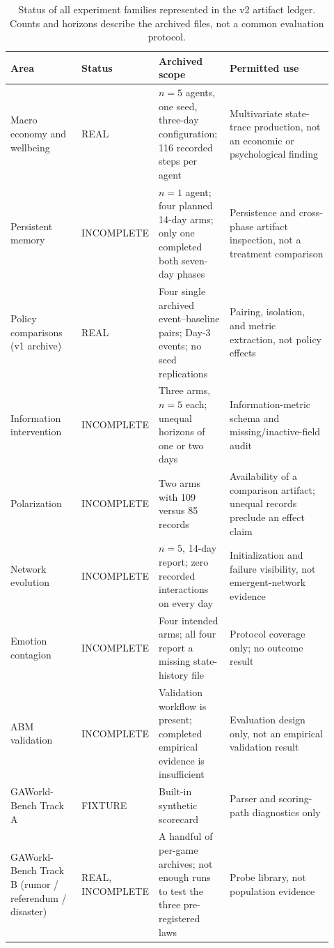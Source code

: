 \begin{table}[t]
\centering
\small
\caption{Status of all experiment families represented in the v2
artifact ledger.  Counts and horizons describe the archived files, not a
common evaluation protocol.}
\label{tab:archive-status}
\begin{tabular}{@{}p{0.22\linewidth}p{0.16\linewidth}p{0.22\linewidth}p{0.32\linewidth}@{}}
\toprule
Area & Status & Archived scope & Permitted use \\
\midrule
Macro economy and wellbeing & \textsf{REAL} & $n=5$ agents, one seed, three-day configuration; 116 recorded steps per agent & Multivariate state-trace production, not an economic or psychological finding \\
Persistent memory & \textsf{INCOMPLETE} & $n=1$ agent; four planned 14-day arms; only one completed both seven-day phases & Persistence and cross-phase artifact inspection, not a treatment comparison \\
Policy comparisons (v1 archive) & \textsf{REAL} & Four single archived event--baseline pairs; Day-3 events; no seed replications & Pairing, isolation, and metric extraction, not policy effects \\
Information intervention & \textsf{INCOMPLETE} & Three arms, $n=5$ each; unequal horizons of one or two days & Information-metric schema and missing/inactive-field audit \\
Polarization & \textsf{INCOMPLETE} & Two arms with 109 versus 85 records & Availability of a comparison artifact; unequal records preclude an effect claim \\
Network evolution & \textsf{INCOMPLETE} & $n=5$, 14-day report; zero recorded interactions on every day & Initialization and failure visibility, not emergent-network evidence \\
Emotion contagion & \textsf{INCOMPLETE} & Four intended arms; all four report a missing state-history file & Protocol coverage only; no outcome result \\
ABM validation & \textsf{INCOMPLETE} & Validation workflow is present; completed empirical evidence is insufficient & Evaluation design only, not an empirical validation result \\
GAWorld-Bench Track A & \textsf{FIXTURE} & Built-in synthetic scorecard & Parser and scoring-path diagnostics only \\
GAWorld-Bench Track B (rumor / referendum / disaster) & \textsf{REAL}, \textsf{INCOMPLETE} & A handful of per-game archives; not enough runs to test the three pre-registered laws & Probe library, not population evidence \\

\end{tabular}
\end{table}
